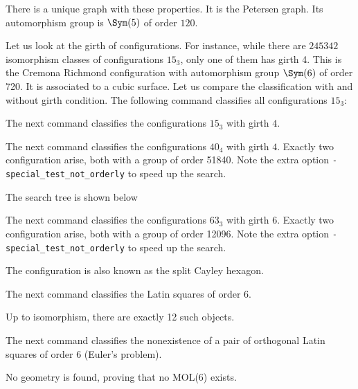 
There is a unique graph with these properties. 
It is the Petersen graph. 
Its automorphism group is $\Sym(5)$ of order $120.$

\bigskip

Let us look at the girth of configurations.
For instance, while there are $245342$ 
isomorphism classes of configurations $15_3$, 
only one of them has girth 4. 
This is the Cremona Richmond configuration 
with automorphism group $\Sym(6)$ of order 720. 
It is associated to a cubic surface.
Let us compare the classification with and without girth condition.
The following command classifies all configurations $15_3$:


The next command classifies the configurations $15_3$ with girth $4.$ 



\bigskip


The next command classifies the configurations $40_4$ with girth $4.$ 
Exactly two configuration arise, both with a group of order 51840. 
Note the extra option \verb'-special_test_not_orderly' to speed up the search.


The search tree is shown below



\bigskip

The next command classifies the configurations $63_3$ with girth $6.$ 
Exactly two configuration arise, both with a group of order 12096. 
Note the extra option \verb'-special_test_not_orderly' to speed up the search.


The configuration is also known as the split Cayley hexagon.


\bigskip

The next command classifies the Latin squares of order $6.$ 


Up to isomorphism, there are exactly 12 such objects.


\bigskip


The next command classifies the nonexistence of a pair of orthogonal Latin squares of order 6 (Euler's problem).


No geometry is found, proving that no MOL(6) exists.

\bigskip




